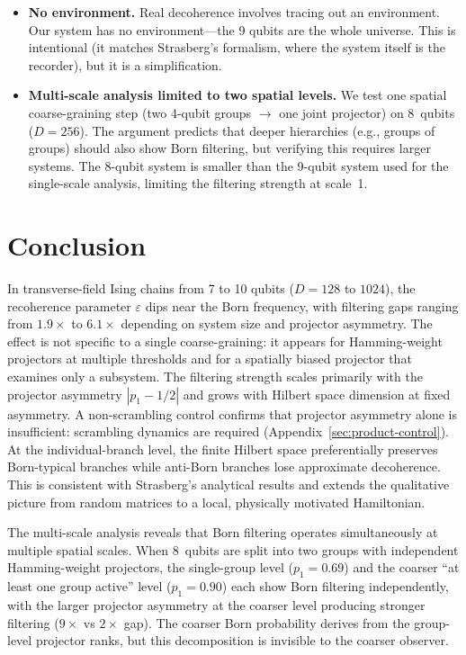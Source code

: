 \documentclass[aps,prd,twocolumn,showpacs,preprintnumbers,amsmath,amssymb,nofootinbib]{revtex4-2}
\begin{document}
\begin{itemize}
  \item \textbf{No environment.} Real decoherence involves tracing out an
    environment. Our system has no environment---the 9 qubits are the whole
    universe. This is intentional (it matches Strasberg's formalism, where the
    system itself is the recorder), but it is a simplification.

  \item \textbf{Multi-scale analysis limited to two spatial levels.} We test
    one spatial coarse-graining step (two 4-qubit groups $\to$ one joint
    projector) on 8~qubits ($D = 256$).  The argument predicts that deeper
    hierarchies (e.g., groups of groups) should also show Born filtering, but
    verifying this requires larger systems.  The 8-qubit system is smaller than
    the 9-qubit system used for the single-scale analysis, limiting the
    filtering strength at scale~1.
\end{itemize}


\section{Conclusion}
\label{sec:conclusion}

In transverse-field Ising chains from 7 to 10 qubits ($D = 128$ to $1024$),
the recoherence parameter $\varepsilon$ dips near the Born frequency, with
filtering gaps ranging from $1.9\times$ to $6.1\times$ depending on system size
and projector asymmetry. The effect is not specific to a single coarse-graining:
it appears for Hamming-weight projectors at multiple thresholds and for a
spatially biased projector that examines only a subsystem. The filtering
strength scales primarily with the projector asymmetry $|p_1 - 1/2|$ and
grows with Hilbert space dimension at fixed asymmetry.
A non-scrambling control confirms that projector asymmetry alone is
insufficient: scrambling dynamics are required (Appendix~\ref{sec:product-control}).
At the individual-branch level, the finite Hilbert space preferentially preserves
Born-typical branches while anti-Born branches lose approximate decoherence.
This is consistent with Strasberg's analytical results and extends the qualitative
picture from random matrices to a local, physically motivated Hamiltonian.

The multi-scale analysis reveals that Born filtering operates simultaneously
at multiple spatial scales.  When 8~qubits are split into two groups with
independent Hamming-weight projectors, the single-group level ($p_1 = 0.69$)
and the coarser ``at least one group active'' level ($p_1 = 0.90$) each show
Born filtering independently, with the larger projector asymmetry at the coarser
level producing stronger filtering ($9\times$ vs $2\times$ gap).  The coarser
Born probability derives from the group-level projector ranks, but this
decomposition is invisible to the coarser observer.
\end{document}
